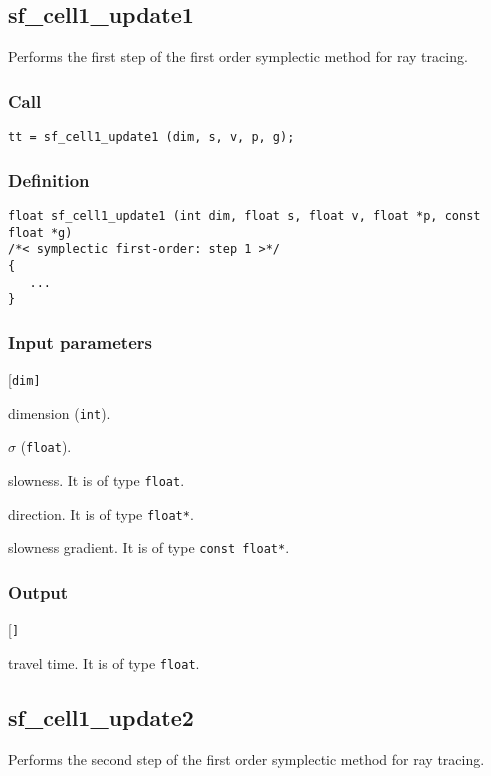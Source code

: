 \subsection{{sf\_cell1\_update1}}
Performs the first step of the first order symplectic method for ray tracing.

\subsubsection*{Call}
\begin{verbatim}tt = sf_cell1_update1 (dim, s, v, p, g);\end{verbatim}

\subsubsection*{Definition}
\begin{verbatim}
float sf_cell1_update1 (int dim, float s, float v, float *p, const float *g) 
/*< symplectic first-order: step 1 >*/
{
   ...
}
\end{verbatim}

\subsubsection*{Input parameters}
\begin{desclist}{\tt }{\quad}[\tt dim]
   \setlength\itemsep{0pt}
   \item[dim] dimension (\texttt{int}).  
   \item[s]   $\sigma$ (\texttt{float}).
   \item[v]   slowness. It is of type \texttt{float}.
   \item[p]   direction. It is of type \texttt{float*}.
   \item[g]   slowness gradient. It is of type \texttt{const float*}.
\end{desclist}

\subsubsection*{Output}
\begin{desclist}{}{\quad}[\tt ]
   \setlength\itemsep{0pt}  
   \item[0.5*v*v*s*(1. + s*pg)] travel time. It is of type \texttt{float}.
\end{desclist}




\subsection{{sf\_cell1\_update2}}
Performs the second step of the first order symplectic method for ray tracing.

